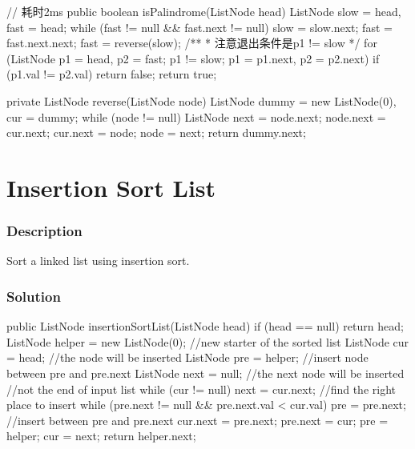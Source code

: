 \begin{Code}
// 耗时2ms
public boolean isPalindrome(ListNode head) {
    ListNode slow = head, fast = head;
    while (fast != null && fast.next != null) {
        slow = slow.next;
        fast = fast.next.next;
    }
    fast = reverse(slow);
    /**
     * 注意退出条件是p1 != slow
     */
    for (ListNode p1 = head, p2 = fast; p1 != slow; p1 = p1.next, p2 = p2.next) {
        if (p1.val != p2.val) {
            return false;
        }
    }
    return true;
}

private ListNode reverse(ListNode node) {
    ListNode dummy = new ListNode(0), cur = dummy;
    while (node != null) {
        ListNode next = node.next;
        node.next = cur.next;
        cur.next = node;
        node = next;
    }
    return dummy.next;
}
\end{Code}

\newpage

\section{Insertion Sort List} %

\subsubsection{Description}
Sort a linked list using insertion sort.

\subsubsection{Solution}

\begin{Code}
public ListNode insertionSortList(ListNode head) {
    if (head == null) {
        return head;
    }
    ListNode helper = new ListNode(0); //new starter of the sorted list
    ListNode cur = head; //the node will be inserted
    ListNode pre = helper; //insert node between pre and pre.next
    ListNode next = null; //the next node will be inserted
    //not the end of input list
    while (cur != null) {
        next = cur.next;
        //find the right place to insert
        while (pre.next != null && pre.next.val < cur.val) {
            pre = pre.next;
        }
        //insert between pre and pre.next
        cur.next = pre.next;
        pre.next = cur;
        pre = helper;
        cur = next;
    }
    return helper.next;
}
\end{Code}

\newpage

